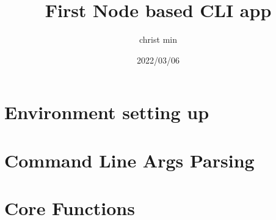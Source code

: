 \documentclass{article}
\title{First Node based CLI app}
\author{christ min}
\date{2022/03/06}
\begin{document}
\maketitle
\section{Environment setting up}
 

%	

\section{Command Line Args Parsing}

\section{Core Functions}
\end{document}
